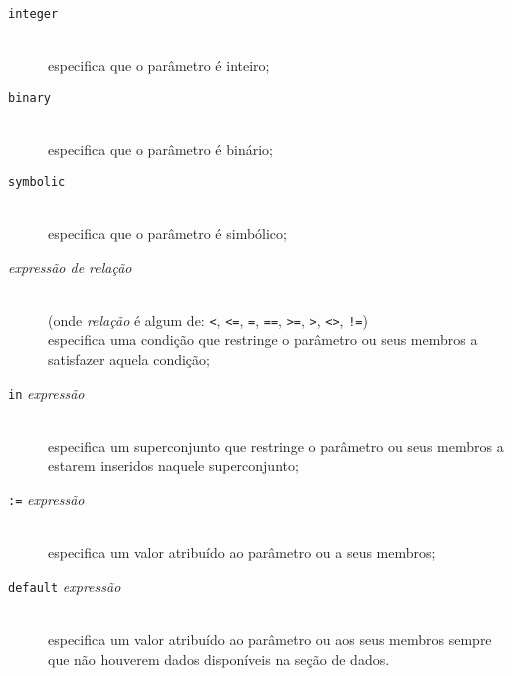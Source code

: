 \documentclass[11pt, brazil]{report}
\begin{document}
\begin{description}
\item[{\tt integer}]\hspace*{0pt}\\
especifica que o parâmetro é inteiro;
\item[{\tt binary}]\hspace*{0pt}\\
especifica que o parâmetro é binário;
\item[{\tt symbolic}]\hspace*{0pt}\\
especifica que o parâmetro é simbólico;
\item[{\it expressão de relação}]\hspace*{0pt}\\
(onde {\it relação} é algum de: {\tt<}, {\tt<=}, {\tt=}, {\tt==},
{\tt>=}, {\tt>}, {\tt<>}, {\tt!=})\\
especifica uma condição que restringe o parâmetro ou seus membros a
satisfazer aquela condição;
\item[{\tt in} {\it expressão}]\hspace*{0pt}\\
especifica um superconjunto que restringe o parâmetro ou seus membros
a estarem inseridos naquele superconjunto;
\item[{\tt:=} {\it expressão}]\hspace*{0pt}\\
especifica um valor atribuído ao parâmetro ou a seus membros;
\item[{\tt default} {\it expressão}]\hspace*{0pt}\\
especifica um valor atribuído ao parâmetro ou aos seus membros sempre
que não houverem dados disponíveis na seção de dados.
\end{description}
\end{document}

